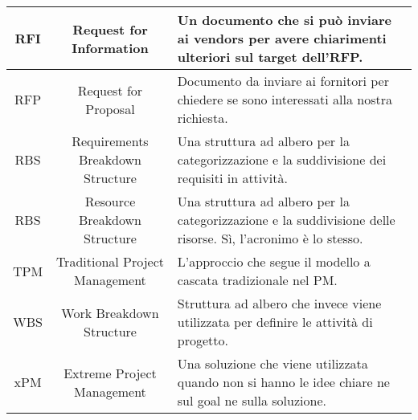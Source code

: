 \begin{tabularx}{\textwidth}{|c|c|X|}
	\hline
	RFI & Request for Information & Un documento che si può inviare ai vendors per avere chiarimenti ulteriori sul target dell'RFP. \\
	\hline
	RFP & Request for Proposal & Documento da inviare ai fornitori per chiedere se sono interessati alla nostra richiesta. \\
	\hline
	RBS & Requirements Breakdown Structure & Una struttura ad albero per la categorizzazione e la suddivisione dei requisiti in attività. \\
	\hline
	RBS & Resource Breakdown Structure & Una struttura ad albero per la categorizzazione e la suddivisione delle risorse. Sì, l'acronimo è lo stesso. \\
	\hline
	TPM & Traditional Project Management & L'approccio che segue il modello a cascata tradizionale nel PM. \\
	\hline
	WBS & Work Breakdown Structure & Struttura ad albero che invece viene utilizzata per definire le attività di progetto.\\
	\hline
	xPM & Extreme Project Management &  Una soluzione che viene utilizzata quando non si hanno le idee chiare ne sul goal ne sulla soluzione.\\
	\hline
\end{tabularx}

